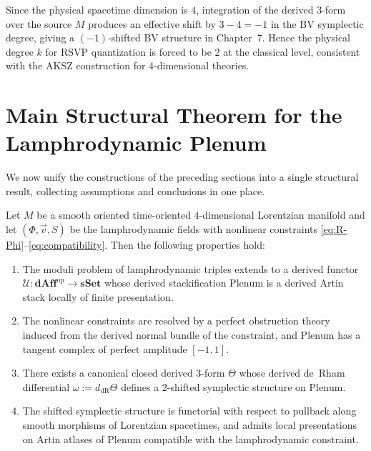\begin{remark}
Since the physical spacetime dimension is $4$,
integration of the derived $3$-form over the source $M$ produces an
effective shift by $3-4=-1$ in the BV symplectic degree, giving a
$(-1)$-shifted BV structure in Chapter~7. Hence the physical degree $k$
for RSVP quantization is forced to be $2$ at the classical level,
consistent with the AKSZ construction for $4$-dimensional theories.
\end{remark}

\section{Main Structural Theorem for the Lamphrodynamic Plenum}

We now unify the constructions of the preceding sections into a single
structural result, collecting assumptions and conclusions in one place.

\begin{theorem}
\label{thm:Main-Plenum}
Let $M$ be a smooth oriented time-oriented $4$-dimensional Lorentzian
manifold and let $(\Phi,\vec v,S)$ be the lamphrodynamic fields with
nonlinear constraints \eqref{eq:R-Phi}--\eqref{eq:compatibility}.
Then the following properties hold:
\begin{enumerate}
\item The moduli problem of lamphrodynamic triples extends to a derived
functor $\mathcal{U}\colon\mathbf{dAff}^{\mathrm{op}}\to\mathbf{sSet}$
whose derived stackification $\mathrm{Plenum}$ is a derived Artin stack
locally of finite presentation.

\item The nonlinear constraints are resolved by a perfect obstruction
theory induced from the derived normal bundle of the constraint, and
$\mathrm{Plenum}$ has a tangent complex of perfect amplitude $[-1,1]$.

\item There exists a canonical closed derived $3$-form $\Theta$ whose
derived de~Rham differential $\omega := d_{\mathrm{dR}}\Theta$
defines a $2$-shifted symplectic structure on $\mathrm{Plenum}$.

\item The shifted symplectic structure is functorial with respect to
pullback along smooth morphisms of Lorentzian spacetimes,
and admits local presentations on Artin atlases of $\mathrm{Plenum}$
compatible with the lamphrodynamic constraint.
\end{enumerate}
\end{theorem}


